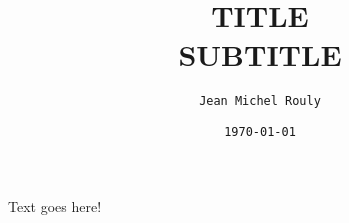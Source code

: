 \documentclass[10pt,letterpaper]{article}
\title{
  \textbf{TITLE} \\
  \Large SUBTITLE
}
\author{\texttt{Jean Michel Rouly}}
\date{\texttt{\today}}
\begin{document}
\maketitle

\doublespacing


Text goes here!


\newpage


\end{document}
